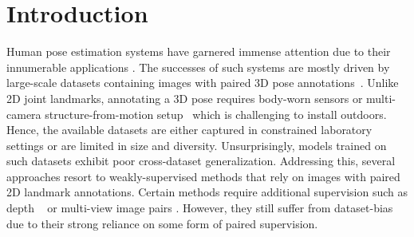 \documentclass{article}
\begin{document}
\section{Introduction}\vspace{-3mm}
Human pose estimation systems have garnered immense attention due to their innumerable applications \cite{norman2017cyberpsychology,gleicher1998retargetting,yan2018spatial}.  The successes of such systems are mostly driven by large-scale datasets containing images with paired 3D pose annotations~\cite{ionescu2013human3}. Unlike 2D joint landmarks, annotating a 3D pose requires body-worn sensors or multi-camera structure-from-motion setup~\cite{sigal2010humaneva} which is challenging to install outdoors. Hence, the available datasets are either captured in constrained laboratory settings or are limited in size and diversity. Unsurprisingly, models trained on such datasets exhibit poor cross-dataset generalization. Addressing this, several approaches \cite{chen2019unsupervised,tung2017adversarial,novotny2019c3dpo,kong2019deep} resort to weakly-supervised methods that rely on images with paired 2D landmark annotations. Certain methods require additional supervision such as depth ~\cite{wandt2019repnet,chen2019unsupervised} or 
multi-view image pairs \cite{rhodin2018learning,kocabas2019self}. However, they still suffer from dataset-bias due to their strong reliance on some form of paired supervision.
\end{document}
